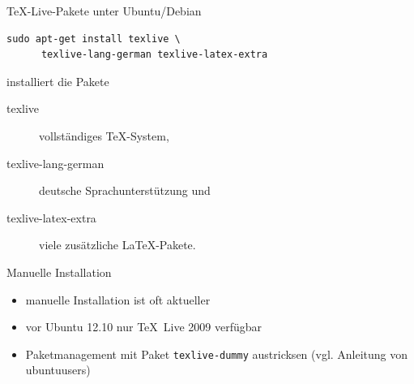 \begin{Frame}[fragile]{\TeX-Live-Pakete unter Ubuntu/Debian}
  \begin{lstlisting}[gobble=4,language={},morekeywords={sudo,apt,get}]
    sudo apt-get install texlive \
      texlive-lang-german texlive-latex-extra
  \end{lstlisting}

  installiert die Pakete

  \begin{description}
    \item[texlive] vollständiges \TeX-System, 
    \item[texlive-lang-german] deutsche Sprachunterstützung und
    \item[texlive-latex-extra] viele zusätzliche \LaTeX-Pakete.
  \end{description}

  \begin{alertblock}{Manuelle Installation}
    \begin{itemize}
      \item manuelle Installation ist oft aktueller
      \item vor Ubuntu 12.10 nur \TeX\ Live 2009 verfügbar
      \item Paketmanagement mit Paket \texttt{texlive-dummy} austricksen
        (vgl. Anleitung von ubuntuusers)
    \end{itemize}
  \end{alertblock}
\end{Frame}

